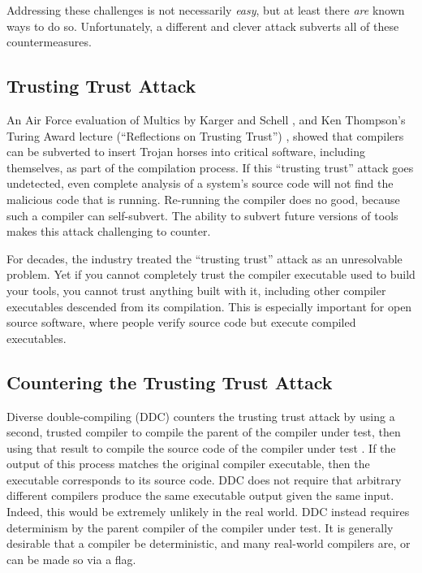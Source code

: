 Addressing these challenges is not necessarily \emph{easy}, but at least there \emph{are} known ways to do so. Unfortunately, a different and clever attack subverts all of these countermeasures.

\subsection{Trusting Trust Attack}

An Air Force evaluation of Multics by Karger and Schell \cite{karger1974multics,karger2002thirty}, and Ken Thompson's Turing Award lecture (``Reflections on Trusting Trust'') \cite{thompson1984trust}, showed that compilers can be subverted to insert Trojan horses into critical software, including themselves, as part of the compilation process. If this ``trusting trust'' attack goes undetected, even complete analysis of a system's source code will not find the malicious code that is running. Re-running the compiler does no good, because such a compiler can self-subvert. The ability to subvert future versions of tools makes this attack challenging to counter.

For decades, the industry treated the ``trusting trust'' attack as an unresolvable problem. Yet if you cannot completely trust the compiler executable used to build your tools, you cannot trust anything built with it, including other compiler executables descended from its compilation. This is especially important for open source software, where people verify source code but execute compiled executables.

\subsection{Countering the Trusting Trust Attack}

Diverse double-compiling (DDC) counters the trusting trust attack by using a second, trusted compiler to compile the parent of the compiler under test, then using that result to compile the source code of the compiler under test \cite{wheeler2010ddc}. If the output of this process matches the original compiler executable, then the executable corresponds to its source code. DDC does not require that arbitrary different compilers produce the same executable output given the same input. Indeed, this would be extremely unlikely in the real world. DDC instead requires determinism by the parent compiler of the compiler under test. It is generally desirable that a compiler be deterministic, and many real-world compilers are, or can be made so via a flag.

